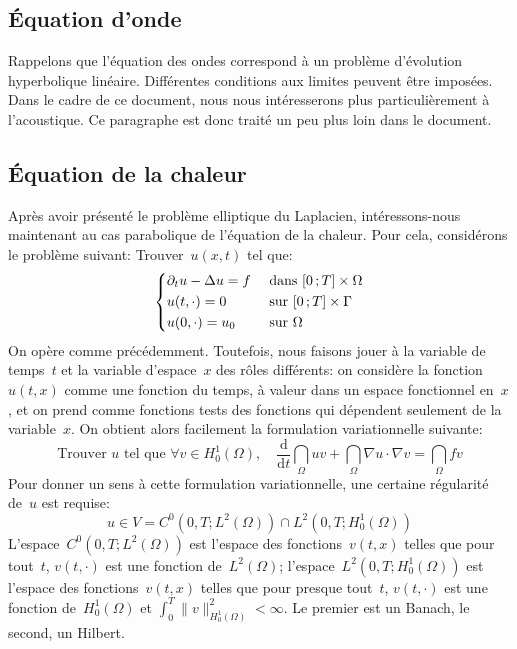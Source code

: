 \medskip
\subsection{Équation d'onde}
Rappelons que l'équation des ondes correspond à un problème d'évolution hyperbolique linéaire. Différentes conditions aux limites peuvent être imposées. Dans le cadre de ce document, nous nous intéresserons plus particulièrement à l'acoustique. Ce paragraphe est donc traité un peu plus loin dans le document.

\medskip
\subsection{Équation de la chaleur}
Après avoir présenté le problème elliptique du Laplacien, intéressons-nous maintenant au cas parabolique de l'équation de la chaleur. Pour cela, considérons le problème suivant:
Trouver~$u(x,t)$ tel que:
\begin{equation}
\left\{
\begin{aligned}
&\partial_t u -\Delta u = f &&\text{ dans } \mathopen{[}0\,;T\mathclose{]}\times\Omega\\
&u(t,\cdot) = 0 &&\text{ sur } \mathopen{[}0\,;T\mathclose{]}\times\Gamma\\
&u(0,\cdot)=u_0 &&\text{ sur } \Omega
\end{aligned}
\right.
\end{equation}
\medskip
On opère comme précédemment. Toutefois, nous faisons jouer à la variable de temps~$t$ et la variable d'espace~$x$ des rôles différents: on considère la fonction~$u(t, x)$ comme une fonction du temps, à valeur dans un espace fonctionnel en~$x$, et on prend comme fonctions tests des fonctions qui dépendent seulement de la variable~$x$. On obtient alors facilement la formulation variationnelle suivante:
\begin{equation}
\text{Trouver } u \text{ tel que } \forall v\in H^1_0(\Omega),\quad
\dfrac{\mathrm d}{\mathrm dt}\dint_\Omega uv+\dint_\Omega \nabla u\cdot\nabla v=\dint_\Omega fv
\end{equation}
Pour donner un sens à cette formulation variationnelle, une certaine régularité de~$u$ est requise:
\begin{equation}
u\in V = C^0\left(0,T;L^2(\Omega)\right)\cap L^2\left(0,T;H^1_0(\Omega)\right)
\end{equation}
L'espace~$C^0\left(0,T;L^2(\Omega)\right)$ est l'espace des fonctions~$v(t,x)$ telles que pour tout~$t$, $v(t,\cdot)$ est une fonction de~$L^2(\Omega)$; l'espace~$L^2\left(0,T;H^1_0(\Omega)\right)$ est l'espace des fonctions~$v(t,x)$ telles
que pour presque tout~$t$, $v(t,\cdot)$ est une fonction de~$H^1_0(\Omega)$ et $\int_0^T \|v\|^2_{H^1_0(\Omega)}<\infty$. Le premier est un Banach, le second, un Hilbert.

